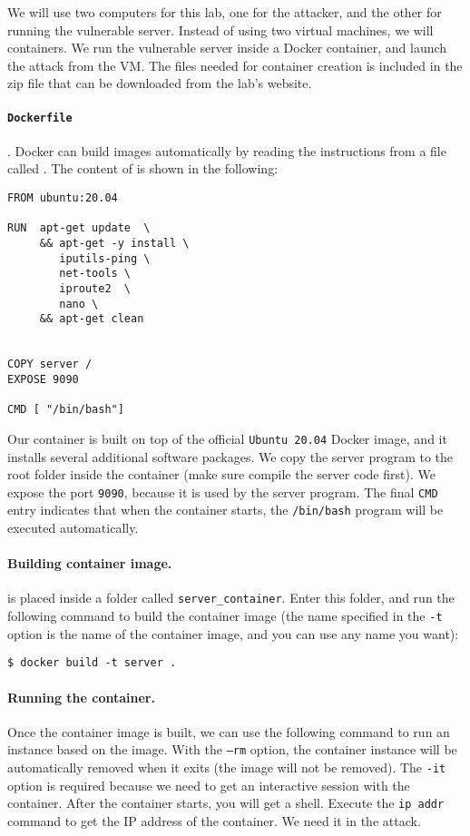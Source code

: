We will use two computers for this lab, one for the attacker,
and the other for running the vulnerable server. Instead of 
using two virtual machines, we will containers. 
We run the vulnerable server inside a Docker container, and 
launch the attack from the VM. The files needed for 
container creation is included in the zip file
that can be downloaded from the lab's website. 


\paragraph{\texttt{Dockerfile}}. 
Docker can build images automatically by reading the instructions from a 
file called \dockerfile. 
The content of \dockerfile is shown in the following:

\begin{lstlisting}
FROM ubuntu:20.04
  
RUN  apt-get update  \
     && apt-get -y install \
        iputils-ping \
        net-tools \
        iproute2  \
        nano \
     && apt-get clean


COPY server /
EXPOSE 9090

CMD [ "/bin/bash"]
\end{lstlisting}
 

Our container is built on top of the official \texttt{Ubuntu 20.04} Docker image,
and it installs several additional software packages. 
We copy the server program to the root folder inside the container (make sure 
compile the server code first). We expose the port \texttt{9090}, because
it is used by the server program. The final \texttt{CMD} entry
indicates that when the container starts, the \texttt{/bin/bash} program 
will be executed automatically. 


\paragraph{Building container image.}
\dockerfile is placed inside a folder called \texttt{server\_container}. Enter 
this folder, and run the following command to build the container image (the 
name specified in the \texttt{-t} option is the name of the container image, and you can
use any name you want): 

\begin{lstlisting}
$ docker build -t server . 
\end{lstlisting}



\paragraph{Running the container.}
Once the container image is built, we can use the following command to run an
instance based on the image. With the \texttt{--rm} option, the container instance will be 
automatically removed when it exits (the image will not be removed). 
The \texttt{-it} option is required because we need to get an interactive session
with the container. After the container starts, you will get a shell.
Execute the \texttt{ip addr} command to get the IP address of the container. 
We need it in the attack. 

